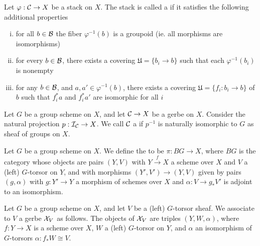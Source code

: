 \begin{defn}
Let $\varphi: \mathcal{C}\rightarrow X$ be a stack on $X$.  The stack is called a  if it satisfies the following additional properties
\begin{enumerate}[(i)]
\item  for all $b\in\mathcal{B}$ the fiber $\varphi^{-1}(b)$ is a groupoid (ie. all morphisms are isomorphisms)
\item  for every $b\in \mathcal{B}$, there exists a covering $\mathfrak U = \{b_i\rightarrow b\}$ such that each $\varphi^{-1}(b_i)$ is nonempty
\item  for any $b\in\mathcal{B}$, and $a,a'\in \varphi^{-1}(b)$, there exists a covering $\mathfrak U=\{f_i: b_i\rightarrow b\}$ of $b$ such that $f_i^*a$ and $f_i^*a'$ are isomorphic for all $i$
\end{enumerate}
\end{defn}

\begin{defn}
Let $G$ be a group scheme on $X$, and let $\mathcal{C}\rightarrow X$ be a gerbe on $X$.  Consider the natural projection $p: \mathcal{I}_{\mathcal{C}}\rightarrow X$.  We call $\mathcal{C}$ a  if $p^{-1}$ is naturally isomorphic to $G$ as sheaf of groups on $X$.
\end{defn}

\begin{ex}
Let $G$ be a group scheme on $X$.  We define the  to be $\pi: BG\rightarrow X$, where $BG$ is the category whose objects are pairs $(Y,V)$ with $Y\xrightarrow{f}X$ a scheme over $X$ and $V$ a (left) $G$-torsor on $Y$, and with morphisms $(Y',V')\rightarrow (Y,V)$ given by pairs $(g,\alpha)$ with $g: Y'\rightarrow Y$ a morphism of schemes over $X$ and $\alpha: V\rightarrow g_*V'$ is adjoint to an isomorphism.
\end{ex}

\begin{ex}
Let $G$ be a group scheme on $X$, and let $V$ be a (left) $G$-torsor sheaf.  We associate to $V$ a gerbe $\mathcal{X}_V$ as follows.  The objects of $\mathcal{X}_V$ are triples $(Y,W,\alpha)$, where $f:Y\rightarrow X$ is a scheme over $X$, $W$ a (left) $G$-torsor on $Y$, and $\alpha$ an isomorphism of $G$-torsors $\alpha: f_*W\cong V$.
\end{ex}

